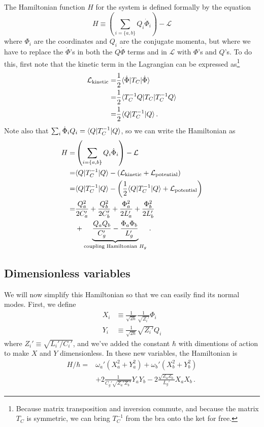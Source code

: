 \documentclass{article}
\begin{document}
The Hamiltonian function $H$ for the system is defined formally by the equation
\begin{equation*}
  H \equiv \left( \sum_{i = \{a, b\}} Q_i \dot \Phi_i \right) - \mathcal{L}
\end{equation*}
where $\Phi_i$ are the coordinates and $Q_i$ are the conjugate momenta, but where we have to replace the $\dot \Phi$'s in both the $Q \dot \Phi$ terms and in $\mathcal{L}$ with $\Phi$'s and $Q$'s.
To do this, first note that the kinetic term in the Lagrangian can be expressed as\footnote{Because matrix transposition and inversion commute, and because the matrix $T_C$ is symmetric, we can bring $T_C^{-1}$ from the bra onto the ket for free.}
\begin{align*}
  \mathcal{L}_\text{kinetic}
  =& \frac{1}{2} \langle \dot \Phi | T_C | \dot \Phi \rangle \\
  =& \frac{1}{2} \langle T_C^{-1} Q | T_C | T_C^{-1} Q \rangle \\
  =& \frac{1}{2} \langle Q | T_C^{-1} | Q \rangle
  \, .
\end{align*}
Note also that $\sum_i \dot \Phi_i Q_i = \langle Q | T_C^{-1} | Q \rangle$, so we can write the Hamiltonian as
\begin{align}
  H
  =& \left( \sum_{i = \{a, b\}} Q_i \dot \Phi_i \right) - \mathcal{L} \nonumber \\
  =& \langle Q | T_C^{-1} | Q \rangle - \left( \mathcal{L}_\text{kinetic} + \mathcal{L}_\text{potential} \right) \nonumber \\
  =& \langle Q | T_C^{-1} | Q \rangle - \left( \frac{1}{2} \langle Q | T_C^{-1} | Q \rangle + \mathcal{L}_\text{potential} \right) \nonumber \\
  =& \frac{Q_a^2}{2 C_a'} + \frac{Q_b^2}{2 C_b'} + \frac{\Phi_a^2}{2 L_a'} + \frac{\Phi_b^2}{2 L_b'} \nonumber \\
  &+ \underbrace{\frac{Q_a Q_b}{C_g'} - \frac{\Phi_a \Phi_b}{L_g'}}_{\text{coupling Hamiltonian }H_g}
  \, .
\end{align}

\subsection{Dimensionless variables}

We will now simplify this Hamiltonian so that we can easily find its normal modes.
First, we define
\begin{align*}
  X_i &\equiv \frac{1}{\sqrt{2 \hbar}} \frac{1}{\sqrt{Z_i'}} \Phi_i \\
  Y_i &\equiv \frac{1}{\sqrt{2 \hbar}} \sqrt{Z_i'} Q_i
\end{align*}
where $Z_i' \equiv \sqrt{L_i' / C_i'}$, and we've added the constant $\hbar$ with dimentions of action to make $X$ and $Y$ dimensionless.
In these new variables, the Hamiltonian is
\begin{align}
  H / \hbar
  =& \omega_a' \left(X_a^2 + Y_a^2 \right)
  +  \omega_b' \left(X_b^2 + Y_b^2 \right) \nonumber \\
  &+ 2 \frac{1}{C_g' \sqrt{Z_a' Z_b'}} Y_a Y_b
   - 2 \frac{\sqrt{Z_a Z_b}}{L_g'} X_a X_b
  \, .
\end{align}
\end{document}
